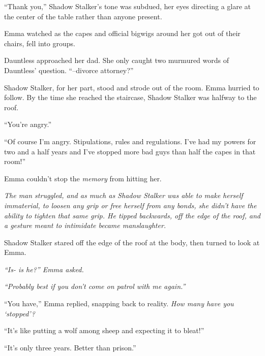``Thank you,'' Shadow Stalker's tone was subdued, her eyes directing a glare at the center of the table rather than anyone present.



Emma watched as the capes and official bigwigs around her got out of their chairs, fell into groups.



Dauntless approached her dad.  She only caught two murmured words of Dauntless' question.  ``--divorce attorney?''



Shadow Stalker, for her part, stood and strode out of the room.  Emma hurried to follow.  By the time she reached the staircase, Shadow Stalker was halfway to the roof.



``You're angry.''



``Of course I'm angry.  Stipulations, rules and regulations.  I've had my powers for two and a half years and I've stopped more bad guys than half the capes in that room!''



Emma couldn't stop the \emph{memory} from hitting her.



\emph{The man struggled, and as much as Shadow Stalker was able to make herself immaterial, to loosen any grip or free herself from any bonds, she didn't have the ability to tighten that same grip.  He tipped backwards, off the edge of the roof, and a gesture meant to intimidate became manslaughter.}



Shadow Stalker stared off the edge of the roof at the body, then turned to look at Emma.



\emph{``Is- is he?''  Emma asked.}



\emph{``Probably best if you don't come on patrol with me again.''}



``You have,'' Emma replied, snapping back to reality.  \emph{How many have you `stopped'?}



``It's like putting a wolf among sheep and expecting it to bleat!''



``It's only three years.  Better than prison.''



